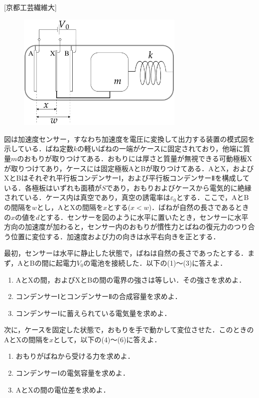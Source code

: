 


\noindent
{} [京都工芸繊維大]

\begin{figure}
  \centering
  \includegraphics[width=8cm]{fig/fig_4_23.pdf}
\end{figure}
図は加速度センサー，すなわち加速度を電圧に変換して出力する装置の模式図を示している．ばね定数$k$の軽いばねの一端がケースに固定されており，他端に質量$m$のおもりが取りつけてある．おもりには厚さと質量が無視できる可動極板Xが取りつけてあり，ケースには固定極板AとBが取りつけてある．AとX，およびXとBはそれぞれ平行板コンデンサーⅠ，および平行板コンデンサーⅡを構成している．各極板はいずれも面積が$S$であり，おもりおよびケースから電気的に絶縁されている．ケース内は真空であり，真空の誘電率は$\varepsilon_0$とする．ここで，AとBの間隔を$w$とし，AとXの間隔を$x$とする($x < w$)．ばねが自然の長さであるときの$x$の値を$d$とする．センサーを図のように水平に置いたとき，センサーに水平方向の加速度が加わると，センサー内のおもりが慣性力とばねの復元力のつり合う位置に変位する．加速度および力の向きは水平右向きを正とする．

最初，センサーは水平に静止した状態で，ばねは自然の長さであったとする．まず，AとBの間に起電力$V_0$の電池を接続した．以下の(1)〜(3)に答えよ．

\begin{enumerate}[(1)]
  \item AとXの間，およびXとBの間の電界の強さは等しい．その強さを求めよ．
  \item コンデンサーⅠとコンデンサーⅡの合成容量を求めよ．
  \item コンデンサーⅠに蓄えられている電気量を求めよ．
\end{enumerate}

次に，ケースを固定した状態で，おもりを手で動かして変位させた．このときのAとXの間隔を$x$として，以下の(4)〜(6)に答えよ．
\begin{enumerate}[(1), resume]
  \item おもりがばねから受ける力を求めよ．
  \item コンデンサーⅠの電気容量を求めよ．
  \item AとXの間の電位差を求めよ．
\end{enumerate}

